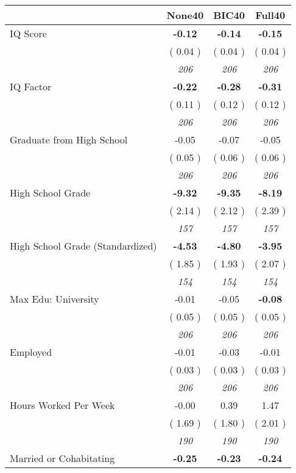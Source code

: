 \begin{tabular}{l c c c}
\toprule
 & None40 & BIC40 & Full40 \\
\midrule
IQ Score & \textbf{     -0.12 } & \textbf{     -0.14 } & \textbf{     -0.15 } \\
& (     0.04 ) & (     0.04 ) & (     0.04 ) \\
& \textit{ 206 } & \textit{ 206 } & \textit{ 206 } \\
IQ Factor & \textbf{     -0.22 } & \textbf{     -0.28 } & \textbf{     -0.31 } \\
& (     0.11 ) & (     0.12 ) & (     0.12 ) \\
& \textit{ 206 } & \textit{ 206 } & \textit{ 206 } \\
Graduate from High School &     -0.05 &     -0.07 &     -0.05 \\
& (     0.05 ) & (     0.06 ) & (     0.06 ) \\
& \textit{ 206 } & \textit{ 206 } & \textit{ 206 } \\
High School Grade & \textbf{     -9.32 } & \textbf{     -9.35 } & \textbf{     -8.19 } \\
& (     2.14 ) & (     2.12 ) & (     2.39 ) \\
& \textit{ 157 } & \textit{ 157 } & \textit{ 157 } \\
High School Grade (Standardized) & \textbf{     -4.53 } & \textbf{     -4.80 } & \textbf{     -3.95 } \\
& (     1.85 ) & (     1.93 ) & (     2.07 ) \\
& \textit{ 154 } & \textit{ 154 } & \textit{ 154 } \\
Max Edu: University &     -0.01 &     -0.05 & \textbf{     -0.08 } \\
& (     0.05 ) & (     0.05 ) & (     0.05 ) \\
& \textit{ 206 } & \textit{ 206 } & \textit{ 206 } \\
Employed &     -0.01 &     -0.03 &     -0.01 \\
& (     0.03 ) & (     0.03 ) & (     0.03 ) \\
& \textit{ 206 } & \textit{ 206 } & \textit{ 206 } \\
Hours Worked Per Week &     -0.00 &      0.39 &      1.47 \\
& (     1.69 ) & (     1.80 ) & (     2.01 ) \\
& \textit{ 190 } & \textit{ 190 } & \textit{ 190 } \\
Married or Cohabitating & \textbf{     -0.25 } & \textbf{     -0.23 } & \textbf{     -0.24 } \\

\end{tabular}
